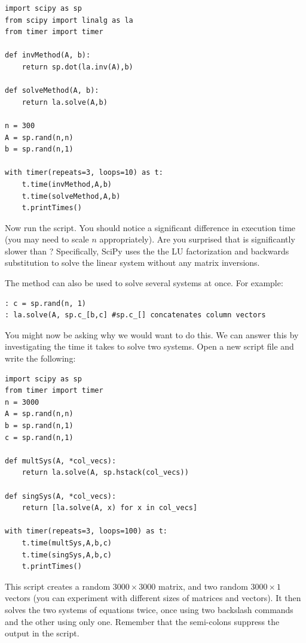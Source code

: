\begin{lstlisting}
import scipy as sp
from scipy import linalg as la
from timer import timer

def invMethod(A, b):
    return sp.dot(la.inv(A),b)

def solveMethod(A, b):
    return la.solve(A,b)
    
n = 300
A = sp.rand(n,n)
b = sp.rand(n,1)

with timer(repeats=3, loops=10) as t:
	t.time(invMethod,A,b)
	t.time(solveMethod,A,b)
	t.printTimes()
\end{lstlisting}

Now run the script. You should notice a significant difference in execution time
(you may need to scale $n$ appropriately). Are you surprised that  is significantly slower than ?  Specifically, SciPy uses the
the LU factorization and backwards substitution to solve the linear system
without any matrix inversions. %

The  method can also be used to solve several systems at once. For example:

\begin{lstlisting}
: c = sp.rand(n, 1)
: la.solve(A, sp.c_[b,c] #sp.c_[] concatenates column vectors
\end{lstlisting}

You might now be asking why we would want to do this. We can answer this by
investigating the time it takes to solve two systems. Open a new script file and
write the following:

\begin{lstlisting}
import scipy as sp
from timer import timer
n = 3000
A = sp.rand(n,n)
b = sp.rand(n,1)
c = sp.rand(n,1)

def multSys(A, *col_vecs):
    return la.solve(A, sp.hstack(col_vecs))
    
def singSys(A, *col_vecs):
    return [la.solve(A, x) for x in col_vecs]

with timer(repeats=3, loops=100) as t:
    t.time(multSys,A,b,c)
    t.time(singSys,A,b,c)
    t.printTimes()
\end{lstlisting}

This script creates a random $3000 \times 3000$ matrix, and two random $3000
\times 1$ vectors (you can experiment with different sizes of matrices and
vectors). It then solves the two systems of equations twice, once using two
backslash commands and the other using only one. Remember that the semi-colons
suppress the output in the script.

